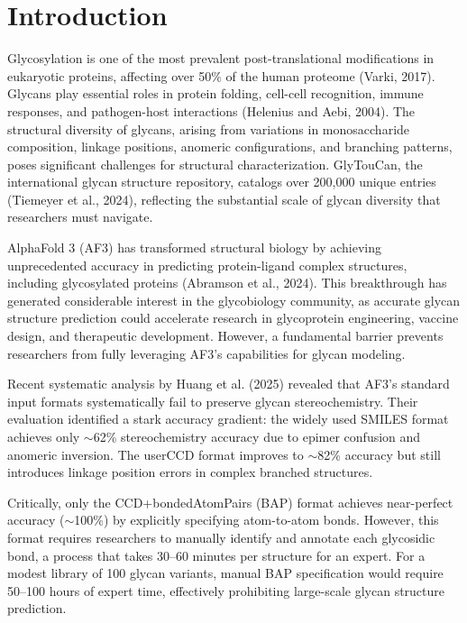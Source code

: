 \documentclass[11pt,a4paper]{article}
\begin{document}
\section{Introduction}

Glycosylation is one of the most prevalent post-translational modifications in eukaryotic proteins, affecting over 50\% of the human proteome (Varki, 2017). Glycans play essential roles in protein folding, cell-cell recognition, immune responses, and pathogen-host interactions (Helenius and Aebi, 2004). The structural diversity of glycans, arising from variations in monosaccharide composition, linkage positions, anomeric configurations, and branching patterns, poses significant challenges for structural characterization. GlyTouCan, the international glycan structure repository, catalogs over 200,000 unique entries (Tiemeyer et al., 2024), reflecting the substantial scale of glycan diversity that researchers must navigate.

AlphaFold 3 (AF3) has transformed structural biology by achieving unprecedented accuracy in predicting protein-ligand complex structures, including glycosylated proteins (Abramson et al., 2024). This breakthrough has generated considerable interest in the glycobiology community, as accurate glycan structure prediction could accelerate research in glycoprotein engineering, vaccine design, and therapeutic development. However, a fundamental barrier prevents researchers from fully leveraging AF3's capabilities for glycan modeling.

Recent systematic analysis by Huang et al. (2025) revealed that AF3's standard input formats systematically fail to preserve glycan stereochemistry. Their evaluation identified a stark accuracy gradient: the widely used SMILES format achieves only $\sim$62\% stereochemistry accuracy due to epimer confusion and anomeric inversion. The userCCD format improves to $\sim$82\% accuracy but still introduces linkage position errors in complex branched structures.

Critically, only the CCD+bondedAtomPairs (BAP) format achieves near-perfect accuracy ($\sim$100\%) by explicitly specifying atom-to-atom bonds. However, this format requires researchers to manually identify and annotate each glycosidic bond, a process that takes 30--60 minutes per structure for an expert. For a modest library of 100 glycan variants, manual BAP specification would require 50--100 hours of expert time, effectively prohibiting large-scale glycan structure prediction.
\end{document}
